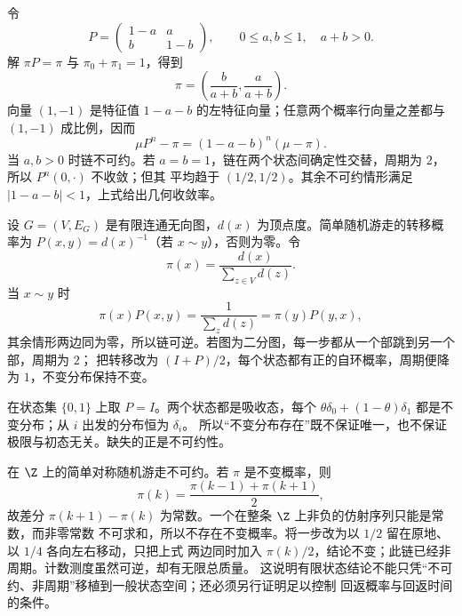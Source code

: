\begin{example}[二状态链]\label{ex:6-3-2-1}
令
\[
 P=\begin{pmatrix}1-a&a\\ b&1-b\end{pmatrix},
 \qquad 0\leq a,b\leq1,\quad a+b>0.
\]
解 $\pi P=\pi$ 与 $\pi_0+\pi_1=1$，得到
\[
 \pi=\left(\frac b{a+b},\frac a{a+b}\right).
\]
向量 $(1,-1)$ 是特征值 $1-a-b$ 的左特征向量；任意两个概率行向量之差都与
$(1,-1)$ 成比例，因而
\[
 \mu P^n-\pi=(1-a-b)^n(\mu-\pi).
\]
当 $a,b>0$ 时链不可约。若 $a=b=1$，链在两个状态间确定性交替，周期为 $2$，所以
$P^n(0,\cdot)$ 不收敛；但其 \Cesaro{} 平均趋于 $(1/2,1/2)$。其余不可约情形满足
$|1-a-b|<1$，上式给出几何收敛率。
\end{example}

\begin{example}[有限无向图上的随机游走]\label{ex:6-3-2-2}
设 $G=(V,E_G)$ 是有限连通无向图，$d(x)$ 为顶点度。简单随机游走的转移概率为
$P(x,y)=d(x)^{-1}$（若 $x\sim y$），否则为零。令
\[
 \pi(x)=\frac{d(x)}{\sum_{z\in V}d(z)}.
\]
当 $x\sim y$ 时
\[
 \pi(x)P(x,y)=\frac1{\sum_zd(z)}=\pi(y)P(y,x),
\]
其余情形两边同为零，所以链可逆。若图为二分图，每一步都从一个部跳到另一个部，周期为 $2$；
把转移改为 $(I+P)/2$，每个状态都有正的自环概率，周期便降为 $1$，不变分布保持不变。
\end{example}

\begin{example}[多个闭类]\label{ex:6-3-2-3}
在状态集 $\{0,1\}$ 上取 $P=I$。两个状态都是吸收态，每个
$\theta\delta_0+(1-\theta)\delta_1$ 都是不变分布；从 $i$ 出发的分布恒为 $\delta_i$。
所以“不变分布存在”既不保证唯一，也不保证极限与初态无关。缺失的正是不可约性。
\end{example}

\begin{example}[无限状态中不可约仍不够]\label{ex:6-3-2-4}
在 $\Z$ 上的简单对称随机游走不可约。若 $\pi$ 是不变概率，则
\[
 \pi(k)=\frac{\pi(k-1)+\pi(k+1)}2,
\]
故差分 $\pi(k+1)-\pi(k)$ 为常数。一个在整条 $\Z$ 上非负的仿射序列只能是常数，而非零常数
不可求和，所以不存在不变概率。将一步改为以 $1/2$ 留在原地、以 $1/4$ 各向左右移动，只把上式
两边同时加入 $\pi(k)/2$，结论不变；此链已经非周期。计数测度虽然可逆，却有无限总质量。
这说明有限状态结论不能只凭“不可约、非周期”移植到一般状态空间；还必须另行证明足以控制
回返概率与回返时间的条件。
\end{example}

